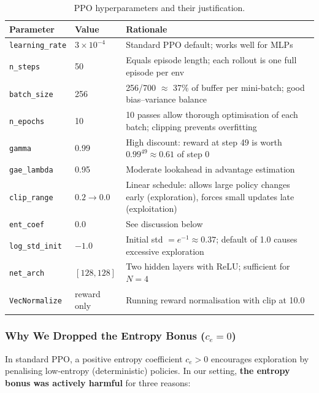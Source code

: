 \documentclass[11pt]{article}
\begin{document}
\begin{table}[H]
\centering
\begin{tabular}{llp{7.5cm}}
\toprule
Parameter & Value & Rationale \\
\midrule
\texttt{learning\_rate} & $3 \times 10^{-4}$ & Standard PPO default; works well for MLPs \\
\texttt{n\_steps} & 50 & Equals episode length; each rollout is one full episode per env \\
\texttt{batch\_size} & 256 & 256/700 $\approx$ 37\% of buffer per mini-batch; good bias--variance balance \\
\texttt{n\_epochs} & 10 & 10 passes allow thorough optimisation of each batch; clipping prevents overfitting \\
\texttt{gamma} & 0.99 & High discount: reward at step 49 is worth $0.99^{49} \approx 0.61$ of step 0 \\
\texttt{gae\_lambda} & 0.95 & Moderate lookahead in advantage estimation \\
\texttt{clip\_range} & $0.2 \to 0.0$ & Linear schedule: allows large policy changes early (exploration), forces small updates late (exploitation) \\
\texttt{ent\_coef} & 0.0 & See discussion below \\
\texttt{log\_std\_init} & $-1.0$ & Initial std $= e^{-1} \approx 0.37$; default of 1.0 causes excessive exploration \\
\texttt{net\_arch} & $[128, 128]$ & Two hidden layers with ReLU; sufficient for $N=4$ \\
\texttt{VecNormalize} & reward only & Running reward normalisation with clip at 10.0 \\
\bottomrule
\end{tabular}
\caption{PPO hyperparameters and their justification.}
\label{tab:hyperparams}
\end{table}

\subsubsection{Why We Dropped the Entropy Bonus ($c_e = 0$)}

In standard PPO, a positive entropy coefficient $c_e > 0$ encourages exploration by penalising low-entropy (deterministic) policies. In our setting, \textbf{the entropy bonus was actively harmful} for three reasons:
\end{document}
